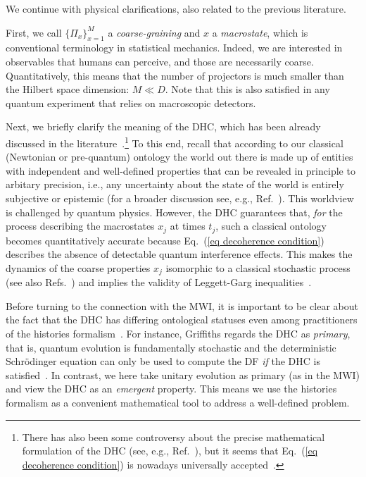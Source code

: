 \documentclass[pre,twocolumn,10pt,aps,longbibliography,nofootinbib]{revtex4-1}
\begin{document}
We continue with physical clarifications, also related to the previous literature.

First, we call $\{\Pi_x\}_{x=1}^M$ a \emph{coarse-graining} and $x$ a \emph{macrostate}, which is conventional terminology in statistical mechanics. Indeed, we are interested in observables that humans can perceive, and those are necessarily coarse. Quantitatively, this means that the number of projectors is much smaller than the Hilbert space dimension: $M\ll D$. Note that this is also satisfied in any quantum experiment that relies on macroscopic detectors.

Next, we briefly clarify the meaning of the DHC, which has been already discussed in the literature~\cite{GriffithsJSP1984, GellMannHartleInBook1990, OmnesRMP1992, DowkerHalliwellPRD1992, GellMannHartlePRD1993, HalliwellANY1995, DowkerKentJSP1996, GriffithsBook2002, GellMannHartlePRA2007, Griffiths2019}.\footnote{There has also been some controversy about the precise mathematical formulation of the DHC (see, e.g., Ref.~\cite{DiosiPRL2004}), but it seems that Eq.~(\ref{eq decoherence condition}) is nowadays universally accepted~\cite{Griffiths2019}. } To this end, recall that according to our classical (Newtonian or pre-quantum) ontology the world out there is made up of entities with independent and well-defined properties that can be revealed in principle to arbitary precision, i.e., any uncertainty about the state of the world is entirely subjective or epistemic (for a broader discussion see, e.g., Ref.~\cite{Barad2007}). This worldview is challenged by quantum physics. However, the DHC guarantees that, \emph{for} the process describing the macrostates $x_j$ at times $t_j$, such a classical ontology becomes quantitatively accurate because Eq.~(\ref{eq decoherence condition}) describes the absence of detectable quantum interference effects. This makes the dynamics of the coarse properties $x_j$ isomorphic to a classical stochastic process (see also Refs.~\cite{SmirneEtAlQST2018, StrasbergDiazPRA2019, MilzEtAlQuantum2020, MilzEtAlPRX2020, MilzModiPRXQ2021, StrasbergBook2022, StrasbergEtAlPRA2023, StrasbergSP2023, SzankowskiCywinskiArXiv2023}) and implies the validity of Leggett-Garg inequalities~\cite{EmaryLambertNoriRPP2014}.

Before turning to the connection with the MWI, it is important to be clear about the fact that the DHC has differing ontological statuses even among practitioners of the histories formalism~\cite{OmnesRMP1992, DowkerKentJSP1996}. For instance, Griffiths regards the DHC as \emph{primary}, that is, quantum evolution is fundamentally stochastic and the deterministic Schr\"odinger equation can only be used to compute the DF \emph{if} the DHC is satisfied~\cite{GriffithsJSP1984, GriffithsBook2002, Griffiths2019}. In contrast, we here take unitary evolution as primary (as in the MWI) and view the DHC as an \emph{emergent} property. This means we use the histories formalism as a convenient mathematical tool to address a well-defined problem.
\end{document}
